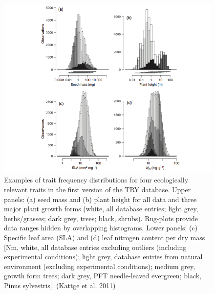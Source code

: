 \documentclass[
  12pt,
  oneside]{book}
\begin{document}
\begin{figure}

{\centering \includegraphics[width=0.8\linewidth]{figures/chap7/f710_try_distr} 

}

\caption{Examples of trait frequency distributions for four ecologically relevant traits in the first version of the TRY database. Upper panels: (a) seed mass and (b) plant height for all data and three major plant growth forms (white, all database entries; light grey, herbs/grasses; dark grey, trees; black, shrubs). Rug-plots provide data ranges hidden by overlapping histograms. Lower panels: (c) Specific leaf area (SLA) and (d) leaf nitrogen content per dry mass [Nm, white, all database entries excluding outliers (including experimental conditions); light grey, database entries from natural environment (excluding experimental conditions); medium grey, growth form trees; dark grey, PFT needle-leaved evergreen; black, Pinus sylvestris]. (Kattge et al. 2011)}\label{fig:f710}
\end{figure}
\end{document}
